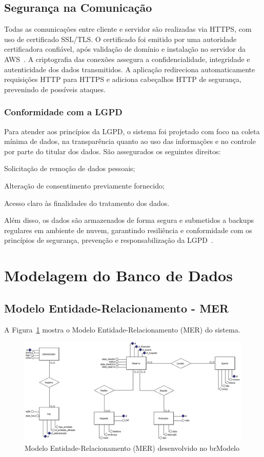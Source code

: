 \documentclass[
	12pt,				%
	openany,			%
	twoside,			%
	a4paper,			%
	english,			%
	french,				%
	spanish,			%
	brazil				%
	]{abntex2}
\begin{document}
\subsection{Segurança na Comunicação}

Todas as comunicações entre cliente e servidor são realizadas via HTTPS, com uso de certificado SSL/TLS. O certificado foi emitido por uma autoridade certificadora confiável, após validação de domínio e instalação no servidor da AWS~\cite{aws-doc}. A criptografia das conexões assegura a confidencialidade, integridade e autenticidade dos dados transmitidos.
A aplicação redireciona automaticamente requisições HTTP para HTTPS e adiciona cabeçalhos HTTP de segurança, prevenindo de possíveis ataques.


\subsubsection{Conformidade com a LGPD}
Para atender aos princípios da LGPD, o sistema foi projetado com foco na coleta mínima de dados, na transparência quanto ao uso das informações e no controle por parte do titular dos dados. São assegurados os seguintes direitos:

Solicitação de remoção de dados pessoais;

Alteração de consentimento previamente fornecido;

Acesso claro às finalidades do tratamento dos dados.

Além disso, os dados são armazenados de forma segura e submetidos a backups regulares em ambiente de nuvem, garantindo resiliência e conformidade com os princípios de segurança, prevenção e responsabilização da LGPD~\cite{lgpd}.


\section{Modelagem do Banco de Dados}
\subsection{Modelo Entidade-Relacionamento - MER}

A Figura~\ref{fig:mer} mostra o Modelo Entidade-Relacionamento (MER) do sistema.

\begin{figure}[h!]
	\centering
	\includegraphics[width=\textwidth]{0406-MER.jpg}
	\caption{Modelo Entidade-Relacionamento (MER) desenvolvido no brModelo}
	\label{fig:mer}
\end{figure}
\end{document}
